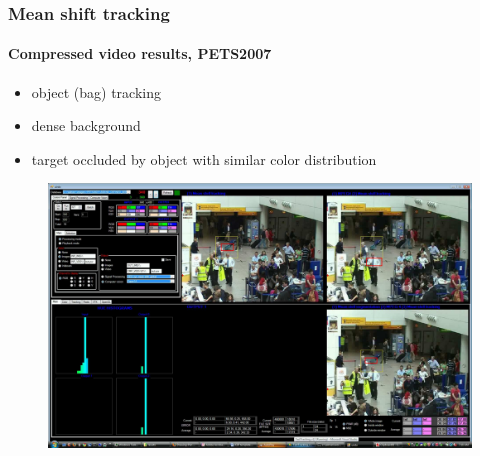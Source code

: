 \begin{frame}
\frametitle{Mean shift tracking}
\framesubtitle{Compressed video results, PETS2007 } 
\logoCSIPCPL\mypagenum
	\begin{itemize}
		\item object (bag) tracking
		\item dense background
		\item target occluded by object with similar color distribution
	\end{itemize}
	\begin{figure}
		\includegraphics[width=1.0\textwidth]{figs/ICIP2009_PETS2007_FN_00340_snapshotVVG.pdf}
	\end{figure}
\end{frame}






